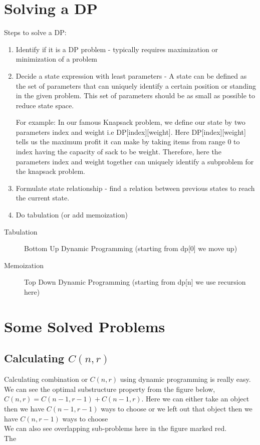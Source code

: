 \documentclass[12pt]{article}
\begin{document}
\section{Solving a DP}
Steps to solve a DP:
	\begin{enumerate}
		\item Identify if it is a DP problem - typically requires maximization or minimization of a problem
		
		\item Decide a state expression with least parameters - A state can be defined as the set of parameters that can uniquely identify a certain position or standing in the given problem. This set of parameters should be as small as possible to reduce state space.
		
		For example: In our famous Knapsack problem, we define our state by two parameters index and weight i.e DP[index][weight]. Here DP[index][weight] tells us the maximum profit it can make by taking items from range 0 to index having the capacity of sack to be weight. Therefore, here the parameters index and weight together can uniquely identify a subproblem for the knapsack problem.
		
		\item Formulate state relationship -  find a relation between previous states to reach the current state.
		   
		\item Do tabulation (or add memoization)
		
	\end{enumerate}

	\begin{description}
		\item[Tabulation] Bottom Up Dynamic Programming (starting from dp[0] we move up) 
		\item[Memoization] Top Down Dynamic Programming (starting from dp[n] we use recursion here)
	\end{description}

\section{Some Solved Problems}

\subsection{Calculating $C(n,r)$}
Calculating combination or $C(n,r)$ using dynamic programming is really easy. We can see the optimal substructure property from the figure below, $C(n,r)=C(n-1,r-1)+C(n-1,r)$. Here we can either take an object then we have $C(n-1,r-1)$ ways to choose or we left out that object then we have $C(n,r-1)$ ways to choose\\ We can also see overlapping sub-problems here in the figure marked red.\\The 
\end{document}
